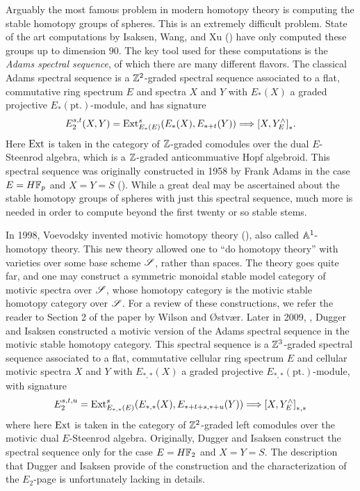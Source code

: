 \documentclass[../main.tex]{subfiles}
\begin{document}
Arguably the most famous problem in modern homotopy theory is computing the stable homotopy groups of spheres. This is an extremely difficult problem. State of the art computations by Isaksen, Wang, and Xu (\cite{isaksen2023stable}) have only computed these groups up to dimension $90$. The key tool used for these computations is the \emph{Adams spectral sequence}, of which there are many different flavors. The classical Adams spectral sequence is a $\mathbb{Z}^2$-graded spectral sequence associated to a flat, commutative ring spectrum $E$ and spectra $X$ and $Y$ with $E_*(X)$ a graded projective $E_*(\text{pt.})$-module, and has signature
\[E_2^{s,t}(X,Y)=\mathrm{Ext}_{E_*(E)}^{s}(E_*(X),E_{*+t}(Y))\Longrightarrow {[X,Y_E^\wedge]}_*.\]
Here $\mathrm{Ext}$ is taken in the category of $\mathbb{Z}$-graded comodules over the dual $E$-Steenrod algebra, which is a $\mathbb{Z}$-graded anticommuative Hopf algebroid. This spectral sequence was originally constructed in 1958 by Frank Adams in the case $E=H\mathbb{F}_p$ and $X=Y=S$ (\cite{Adams1958}). While a great deal may be ascertained about the stable homotopy groups of spheres with just this spectral sequence, much more is needed in order to compute beyond the first twenty or so stable stems.

In 1998, Voevodsky invented motivic homotopy theory (\cite{voevodsky1998a1}), also called $\mathbb A^1$-homotopy theory. This new theory allowed one to ``do homotopy theory'' with  varieties over some base scheme $\mathscr{S}$, rather than spaces. The theory goes quite far, and one may construct a symmetric monoidal stable model category of motivic spectra over $\mathscr{S}$, whose homotopy category is the motivic stable homotopy category over $\mathscr{S}$. For a review of these constructions, we refer the reader to Section 2 of the paper \cite{WilOst} by Wilson and {\O}stv{\ae}r. Later in 2009, \cite{DugIsak}, Dugger and Isaksen constructed a motivic version of the Adams spectral sequence in the motivic stable homotopy category. This spectral sequence is a $\mathbb{Z}^3$-graded spectral sequence associated to a flat, commutative cellular ring spectrum $E$ and cellular motivic spectra $X$ and $Y$ with $E_{*,*}(X)$ a graded projective $E_{*,*}(\text{pt.})$-module, with signature
\[E_2^{s,t,u}=\mathrm{Ext}^s_{E_{*,*}(E)}(E_{*,*}(X),E_{*+t+s,*+u}(Y))\Longrightarrow{[X,Y^\wedge_E]}_{*,*}\]
where here $\mathrm{Ext}$ is taken in the category of $\mathbb{Z}^2$-graded left comodules over the motivic dual $E$-Steenrod algebra. Originally, Dugger and Isaksen construct the spectral sequence only for the case $E=H\mathbb{F}_2$ and $X=Y=S$. The description that Dugger and Isaksen provide of the construction and the characterization of the $E_2$-page is unfortunately lacking in details.
\end{document}
